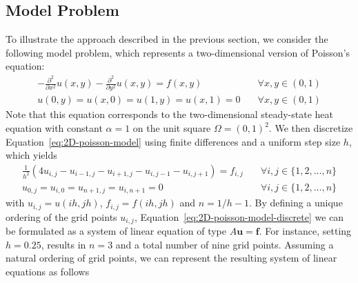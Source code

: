 \subsection{Model Problem}
To illustrate the approach described in the previous section, we consider the following model problem, which represents a two-dimensional version of Poisson's equation:
\begin{equation}
	\begin{split}
		-\frac{\partial^2}{\partial x^2} u(x,y) - \frac{\partial^2}{\partial y^2} u(x,y) = f(x, y) \quad & \forall x, y \in (0, 1) \\
		u(0, y) = u(x, 0) = u(1, y) = u(x, 1) = 0 \quad & \forall x, y \in (0, 1)
	\end{split}
	\label{eq:2D-poisson-model}
\end{equation}
Note that this equation corresponds to the two-dimensional steady-state heat equation with constant $\alpha = 1$ on the unit square $\Omega = ( 0, 1 )^2$.
We then discretize Equation~\eqref{eq:2D-poisson-model} using finite differences and a uniform step size $h$, which yields
\begin{equation}
	\begin{split}
		\frac{1}{h^2} (4 u_{i,j} - u_{i-1, j} - u_{i+1, j} - u_{i, j-1} - u_{i, j+1}) = f_{i, j} \quad & \forall i, j \in \{1, 2, \dots, n\} \\
		u_{0, j} = u_{i, 0} = u_{n+1, j} = u_{i, n+1} = 0 \quad & \forall i, j \in \{1, 2, \dots, n\}
	\end{split} 
	\label{eq:2D-poisson-model-discrete}
\end{equation}
with $u_{i,j} = u(ih, jh)$, $f_{i,j} = f(ih, jh)$ and $n = 1/h - 1$.
By defining a unique ordering of the grid points $u_{i, j}$, Equation~\eqref{eq:2D-poisson-model-discrete} we can be formulated as a system of linear equation of type $A \bm{u} = \bm{f}$. 
For instance, setting $h = 0.25$, results in $n = 3$ and a total number of nine grid points.
Assuming a natural ordering of grid points, we can represent the resulting system of linear equations as follows
